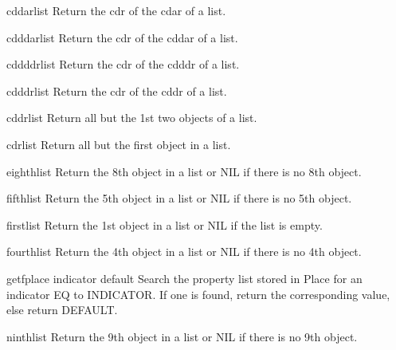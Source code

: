 \begin{accessor}{cddar}{list}{}{}
  Return the cdr of the cdar of a list.
\end{accessor}

\begin{accessor}{cdddar}{list}{}{}
  Return the cdr of the cddar of a list.
\end{accessor}

\begin{accessor}{cddddr}{list}{}{}
  Return the cdr of the cdddr of a list.
\end{accessor}

\begin{accessor}{cdddr}{list}{}{}
  Return the cdr of the cddr of a list.
\end{accessor}

\begin{accessor}{cddr}{list}{}{}
  Return all but the 1st two objects of a list.
\end{accessor}

\begin{accessor}{cdr}{list}{}{}
  Return all but the first object in a list.
\end{accessor}

\begin{accessor}{eighth}{list}{}{}
  Return the 8th object in a list or NIL if there is no 8th object.
\end{accessor}

\begin{accessor}{fifth}{list}{}{}
  Return the 5th object in a list or NIL if there is no 5th object.
\end{accessor}

\begin{accessor}{first}{list}{}{}
  Return the 1st object in a list or NIL if the list is empty.
\end{accessor}

\begin{accessor}{fourth}{list}{}{}
  Return the 4th object in a list or NIL if there is no 4th object.
\end{accessor}

\begin{accessor}{getf}{place indicator \op default}{}{}
  Search the property list stored in Place for an indicator EQ to INDICATOR.
  If one is found, return the corresponding value, else return DEFAULT.
\end{accessor}

\begin{accessor}{ninth}{list}{}{}
  Return the 9th object in a list or NIL if there is no 9th object.
\end{accessor}

